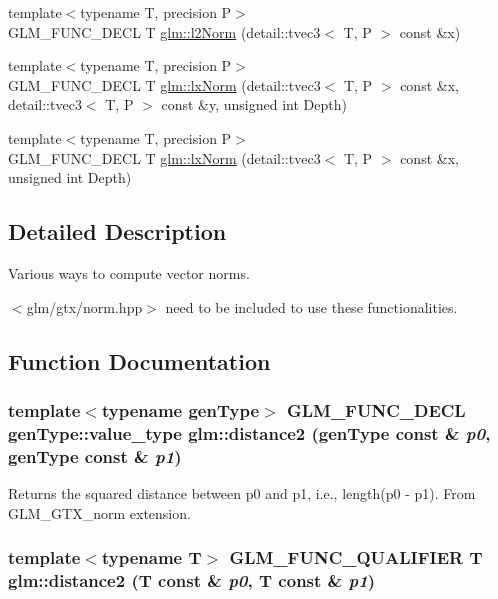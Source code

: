 \begin{CompactItemize}
\item 
{\footnotesize template$<$typename T, precision P$>$ }\\GLM\_\-FUNC\_\-DECL T \hyperlink{group__gtx__norm_g17bb46915f9694cbae612a7bae4c5116}{glm::l2Norm} (detail::tvec3$<$ T, P $>$ const \&x)
\item 
{\footnotesize template$<$typename T, precision P$>$ }\\GLM\_\-FUNC\_\-DECL T \hyperlink{group__gtx__norm_g2f42190c8743abab279d0a8f5a321692}{glm::lxNorm} (detail::tvec3$<$ T, P $>$ const \&x, detail::tvec3$<$ T, P $>$ const \&y, unsigned int Depth)
\item 
{\footnotesize template$<$typename T, precision P$>$ }\\GLM\_\-FUNC\_\-DECL T \hyperlink{group__gtx__norm_g955869c61ab902e4e3cf061303efdaef}{glm::lxNorm} (detail::tvec3$<$ T, P $>$ const \&x, unsigned int Depth)
\end{CompactItemize}


\subsection{Detailed Description}
Various ways to compute vector norms. 

$<$glm/gtx/norm.hpp$>$ need to be included to use these functionalities. 

\subsection{Function Documentation}
\hypertarget{group__gtx__norm_g205e08f24b9e35f9f892b563f2b8dd94}{
\subsubsection[distance2]{\setlength{\rightskip}{0pt plus 5cm}template$<$typename genType$>$ GLM\_\-FUNC\_\-DECL genType::value\_\-type glm::distance2 (genType const \& {\em p0}, \/  genType const \& {\em p1})}}
\label{group__gtx__norm_g205e08f24b9e35f9f892b563f2b8dd94}


Returns the squared distance between p0 and p1, i.e., length(p0 - p1). From GLM\_\-GTX\_\-norm extension. \hypertarget{group__gtx__norm_gaf6befa643aa9616f3c19e5548b11b54}{
\subsubsection[distance2]{\setlength{\rightskip}{0pt plus 5cm}template$<$typename T$>$ GLM\_\-FUNC\_\-QUALIFIER T glm::distance2 (T const \& {\em p0}, \/  T const \& {\em p1})}}
\label{group__gtx__norm_gaf6befa643aa9616f3c19e5548b11b54}


